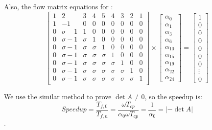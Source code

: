 Also, the flow matrix equations for :
\begin{equation}
{
\left[ \begin{array}{ccccccccc}
1 & 2 & 3 & 4 & 5 & 4 & 3 & 2 & 1\\
1 & -1 & 0 & 0 & 0 & 0 & 0 & 0& 0\\
0 & \sigma-1 & 1 & 0 & 0 & 0 &0 & 0 & 0 \\
0 & \sigma-1 & \sigma & 1 & 0 & 0 & 0 & 0 & 0 \\
0 & \sigma-1 & \sigma & \sigma & 1 & 0 & 0 & 0 & 0\\
0 & \sigma-1 & \sigma & \sigma & \sigma & 1 & 0& 0 & 0\\
0 & \sigma-1 & \sigma & \sigma & \sigma & \sigma & 1 & 0 & 0\\
0 & \sigma-1 & \sigma & \sigma & \sigma & \sigma & \sigma & 1 & 0\\
0 & \sigma-1 & \sigma & \sigma & \sigma & \sigma & \sigma & \sigma & 1\\
\end{array} 
\right ]} \times \left[ \begin{array}{c}
\alpha_{0} \\
\alpha_{1} \\
\alpha_{3} \\
\alpha_{6} \\
\alpha_{10} \\
\alpha_{15}\\
\alpha_{19}\\
\alpha_{22}\\
\alpha_{24}
\end{array} 
\right ] = \left[ \begin{array}{c}
1 \\
0 \\
0 \\
0 \\
0 \\
0 \\
0 \\
\vdots \\
0
\end{array} 
\right ]
\end{equation}

We use the similar method to prove $\det A \neq 0$, so the speedup is:
$$Speedup = \frac{T_{f, 0}}{T_{f, n}}= \frac{\omega T_{cp}}{\alpha_{0}\omega T_{cp}} = \frac{1}{\alpha_{0}} = \left |-\det A \right |$$.

